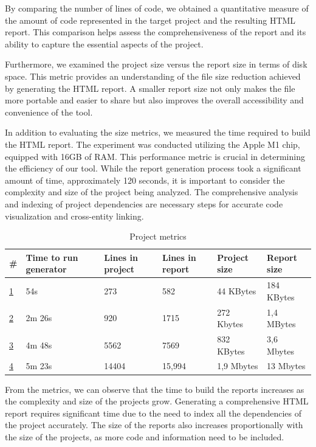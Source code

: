 By comparing the number of lines of code, we obtained a quantitative measure of the amount of code represented in the target project and the resulting HTML report. This comparison helps assess the comprehensiveness of the report and its ability to capture the essential aspects of the project.

Furthermore, we examined the project size versus the report size in terms of disk space. This metric provides an understanding of the file size reduction achieved by generating the HTML report. A smaller report size not only makes the file more portable and easier to share but also improves the overall accessibility and convenience of the tool.

In addition to evaluating the size metrics, we measured the time required to build the HTML report. The experiment was conducted utilizing the Apple M1 chip, equipped with 16GB of RAM. This performance metric is crucial in determining the efficiency of our tool. While the report generation process took a significant amount of time, approximately 120 seconds, it is important to consider the complexity and size of the project being analyzed. The comprehensive analysis and indexing of project dependencies are necessary steps for accurate code visualization and cross-entity linking.

\begin{longtable}{| p{0.7cm} | p{2cm} | p{2.5cm} | p{2.5cm} | p{3cm} | p{3cm}| }
\caption[Project metrics]{Project metrics} \label{table:metrics} \\
\hline
\# & Time to run generator & Lines in project & Lines in report  &  Project size  & Report size \\
\endfirsthead
\endhead
\hline
\href{https://github.com/sevenzing/test-rust-crate/tree/master}{1} & 54s & 273 & 582 & 44 KBytes & 184 KBytes \\
 \hline
\href{https://github.com/sevenzing/thesis}{2} & 2m 26s & 920 & 1715 & 272 Kbytes & 1,4 MBytes \\
 \hline
\href{https://github.com/blockscout/blockscout-rs/tree/main/stats}{3} & 4m 48s & 5562 & 7569 & 832 KBytes & 3,6 Mbytes \\
 \hline
\href{https://github.com/blockscout/blockscout-rs/tree/main/smart-contract-verifier}{4} & 5m 23s & 14404 & 15,994 & 1,9 Mbytes & 13 Mbytes \\
 \hline
\end{longtable}

From the metrics, we can observe that the time to build the reports increases as the complexity and size of the projects grow. Generating a comprehensive HTML report requires significant time due to the need to index all the dependencies of the project accurately. The size of the reports also increases proportionally with the size of the projects, as more code and information need to be included.


